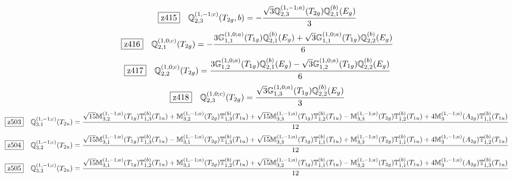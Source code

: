 \documentclass[fleqn,10pt,landscape]{jsarticle}
\begin{document}
\begin{dmath*}
\hspace*{3mm}\fbox{z415}\quad \mathbb{Q}_{2,3}^{(1,-1;c)}(T_{2g},b)=- \frac{\sqrt{3} \mathbb{Q}_{2,3}^{(1,-1;a)}(T_{2g}) \mathbb{Q}_{2,1}^{(b)}(E_{g})}{3}
\end{dmath*}
\begin{dmath*}
\hspace*{3mm}\fbox{z416}\quad \mathbb{Q}_{2,1}^{(1,0;c)}(T_{2g})=- \frac{3 \mathbb{G}_{1,1}^{(1,0;a)}(T_{1g}) \mathbb{Q}_{2,1}^{(b)}(E_{g}) + \sqrt{3} \mathbb{G}_{1,1}^{(1,0;a)}(T_{1g}) \mathbb{Q}_{2,2}^{(b)}(E_{g})}{6}
\end{dmath*}
\begin{dmath*}
\hspace*{3mm}\fbox{z417}\quad \mathbb{Q}_{2,2}^{(1,0;c)}(T_{2g})=\frac{3 \mathbb{G}_{1,2}^{(1,0;a)}(T_{1g}) \mathbb{Q}_{2,1}^{(b)}(E_{g}) - \sqrt{3} \mathbb{G}_{1,2}^{(1,0;a)}(T_{1g}) \mathbb{Q}_{2,2}^{(b)}(E_{g})}{6}
\end{dmath*}
\begin{dmath*}
\hspace*{3mm}\fbox{z418}\quad \mathbb{Q}_{2,3}^{(1,0;c)}(T_{2g})=\frac{\sqrt{3} \mathbb{G}_{1,3}^{(1,0;a)}(T_{1g}) \mathbb{Q}_{2,2}^{(b)}(E_{g})}{3}
\end{dmath*}
\begin{dmath*}
\hspace*{3mm}\fbox{z503}\quad \mathbb{Q}_{3,1}^{(1,-1;c)}(T_{2u})=\frac{\sqrt{15} \mathbb{M}_{3,2}^{(1,-1;a)}(T_{1g}) \mathbb{T}_{1,3}^{(b)}(T_{1u}) + \mathbb{M}_{3,2}^{(1,-1;a)}(T_{2g}) \mathbb{T}_{1,3}^{(b)}(T_{1u}) + \sqrt{15} \mathbb{M}_{3,3}^{(1,-1;a)}(T_{1g}) \mathbb{T}_{1,2}^{(b)}(T_{1u}) - \mathbb{M}_{3,3}^{(1,-1;a)}(T_{2g}) \mathbb{T}_{1,2}^{(b)}(T_{1u}) + 4 \mathbb{M}_{3}^{(1,-1;a)}(A_{2g}) \mathbb{T}_{1,1}^{(b)}(T_{1u})}{12}
\end{dmath*}
\begin{dmath*}
\hspace*{3mm}\fbox{z504}\quad \mathbb{Q}_{3,2}^{(1,-1;c)}(T_{2u})=\frac{\sqrt{15} \mathbb{M}_{3,1}^{(1,-1;a)}(T_{1g}) \mathbb{T}_{1,3}^{(b)}(T_{1u}) - \mathbb{M}_{3,1}^{(1,-1;a)}(T_{2g}) \mathbb{T}_{1,3}^{(b)}(T_{1u}) + \sqrt{15} \mathbb{M}_{3,3}^{(1,-1;a)}(T_{1g}) \mathbb{T}_{1,1}^{(b)}(T_{1u}) + \mathbb{M}_{3,3}^{(1,-1;a)}(T_{2g}) \mathbb{T}_{1,1}^{(b)}(T_{1u}) + 4 \mathbb{M}_{3}^{(1,-1;a)}(A_{2g}) \mathbb{T}_{1,2}^{(b)}(T_{1u})}{12}
\end{dmath*}
\begin{dmath*}
\hspace*{3mm}\fbox{z505}\quad \mathbb{Q}_{3,3}^{(1,-1;c)}(T_{2u})=\frac{\sqrt{15} \mathbb{M}_{3,1}^{(1,-1;a)}(T_{1g}) \mathbb{T}_{1,2}^{(b)}(T_{1u}) + \mathbb{M}_{3,1}^{(1,-1;a)}(T_{2g}) \mathbb{T}_{1,2}^{(b)}(T_{1u}) + \sqrt{15} \mathbb{M}_{3,2}^{(1,-1;a)}(T_{1g}) \mathbb{T}_{1,1}^{(b)}(T_{1u}) - \mathbb{M}_{3,2}^{(1,-1;a)}(T_{2g}) \mathbb{T}_{1,1}^{(b)}(T_{1u}) + 4 \mathbb{M}_{3}^{(1,-1;a)}(A_{2g}) \mathbb{T}_{1,3}^{(b)}(T_{1u})}{12}
\end{dmath*}
\end{document}
